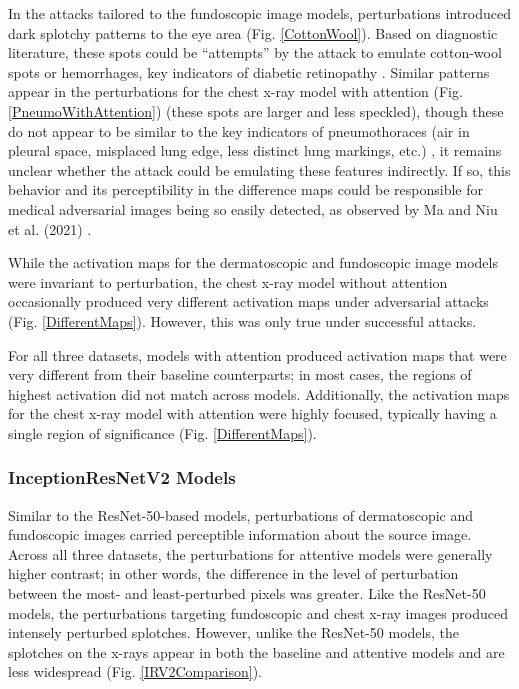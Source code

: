 \documentclass[10pt,twocolumn,letterpaper]{article}
\begin{document}
        
        
        

        In the attacks tailored to the fundoscopic image models, perturbations introduced dark splotchy patterns to the eye area (Fig. \ref{CottonWool}). Based on diagnostic literature, these spots could be ``attempts'' by the attack to emulate cotton-wool spots or hemorrhages, key indicators of diabetic retinopathy \cite{WillsEye}. Similar patterns appear in the perturbations for the chest x-ray model with attention (Fig. \ref{PneumoWithAttention}) (these spots are larger and less speckled), though these do not appear to be similar to the key indicators of pneumothoraces (air in pleural space, misplaced lung edge, less distinct lung markings, etc.) \cite{UnofficialGuide}, it remains unclear whether the attack could be emulating these features indirectly. If so, this behavior and its perceptibility in the difference maps could be responsible for medical adversarial images being so easily detected, as observed by Ma and Niu et al. (2021) \cite{MaNiu}.

        

        While the activation maps for the dermatoscopic and fundoscopic image models were invariant to perturbation, the chest x-ray model without attention occasionally produced very different activation maps under adversarial attacks (Fig. \ref{DifferentMaps}). However, this was only true under successful attacks.

        For all three datasets, models with attention produced activation maps that were very different from their baseline counterparts; in most cases, the regions of highest activation did not match across models. Additionally, the activation maps for the chest x-ray model with attention were highly focused, typically having a single region of significance (Fig. \ref{DifferentMaps}).

      \subsubsection{InceptionResNetV2 Models}
        Similar to the ResNet-50-based models, perturbations of dermatoscopic and fundoscopic images carried perceptible information about the source image. Across all three datasets, the perturbations for attentive models were generally higher contrast; in other words, the difference in the level of perturbation between the most- and least-perturbed pixels was greater. Like the ResNet-50 models, the perturbations targeting fundoscopic and chest x-ray images produced intensely perturbed splotches. However, unlike the ResNet-50 models, the splotches on the x-rays appear in both the baseline and attentive models and are less widespread (Fig. \ref{IRV2Comparison}).
\end{document}
